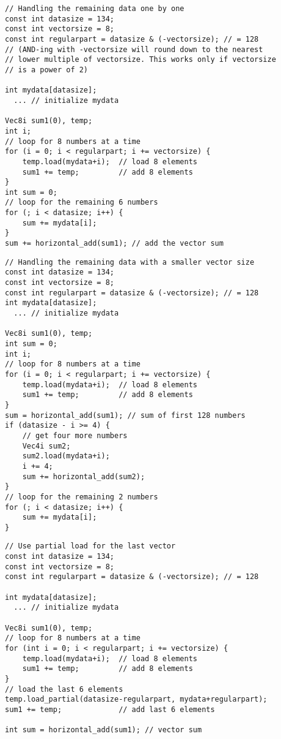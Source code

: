 \documentclass[vcl_manual.tex]{subfiles}
\begin{document}
\begin{example}
\label{exampleOddLoop1}
\end{example}
\begin{lstlisting}[frame=single]
// Handling the remaining data one by one
const int datasize = 134;
const int vectorsize = 8;
const int regularpart = datasize & (-vectorsize); // = 128
// (AND-ing with -vectorsize will round down to the nearest
// lower multiple of vectorsize. This works only if vectorsize
// is a power of 2)

int mydata[datasize];
  ... // initialize mydata

Vec8i sum1(0), temp;
int i;
// loop for 8 numbers at a time
for (i = 0; i < regularpart; i += vectorsize) {
    temp.load(mydata+i);  // load 8 elements
    sum1 += temp;         // add 8 elements
}
int sum = 0;
// loop for the remaining 6 numbers
for (; i < datasize; i++) {
    sum += mydata[i];
}
sum += horizontal_add(sum1); // add the vector sum
\end{lstlisting}


\begin{example}
\label{exampleOddLoop2}
\end{example}
\begin{lstlisting}[frame=single]
// Handling the remaining data with a smaller vector size
const int datasize = 134;
const int vectorsize = 8;
const int regularpart = datasize & (-vectorsize); // = 128
int mydata[datasize];
  ... // initialize mydata

Vec8i sum1(0), temp;
int sum = 0;
int i;
// loop for 8 numbers at a time
for (i = 0; i < regularpart; i += vectorsize) {
    temp.load(mydata+i);  // load 8 elements
    sum1 += temp;         // add 8 elements
}
sum = horizontal_add(sum1); // sum of first 128 numbers
if (datasize - i >= 4) {
    // get four more numbers
    Vec4i sum2;
    sum2.load(mydata+i);
    i += 4;
    sum += horizontal_add(sum2); 
}
// loop for the remaining 2 numbers
for (; i < datasize; i++) {
    sum += mydata[i];
}
\end{lstlisting}


\begin{example}
\label{exampleOddLoop3}
\end{example}
\begin{lstlisting}[frame=single]
// Use partial load for the last vector
const int datasize = 134;
const int vectorsize = 8;
const int regularpart = datasize & (-vectorsize); // = 128

int mydata[datasize];
  ... // initialize mydata

Vec8i sum1(0), temp;
// loop for 8 numbers at a time
for (int i = 0; i < regularpart; i += vectorsize) {
    temp.load(mydata+i);  // load 8 elements
    sum1 += temp;         // add 8 elements
}
// load the last 6 elements
temp.load_partial(datasize-regularpart, mydata+regularpart);
sum1 += temp;             // add last 6 elements

int sum = horizontal_add(sum1); // vector sum
\end{lstlisting}
\end{document}
